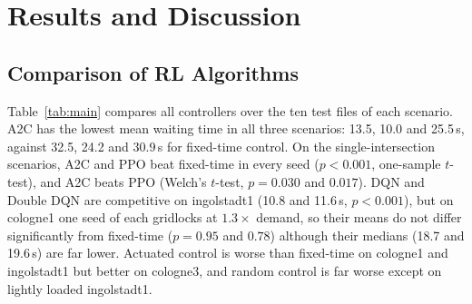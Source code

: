 \section{Results and Discussion}
\label{sec:results}


\subsection{Comparison of RL Algorithms}
Table~\ref{tab:main} compares all controllers over the ten test files of each scenario. A2C has the lowest mean waiting time in all three scenarios: 13.5, 10.0 and 25.5\,s, against 32.5, 24.2 and 30.9\,s for fixed-time control. On the single-intersection scenarios, A2C and PPO beat fixed-time in every seed ($p<0.001$, one-sample $t$-test), and A2C beats PPO (Welch's $t$-test, $p=0.030$ and $0.017$). DQN and Double DQN are competitive on ingolstadt1 (10.8 and 11.6\,s, $p<0.001$), but on cologne1 one seed of each gridlocks at $1.3\times$ demand, so their means do not differ significantly from fixed-time ($p=0.95$ and $0.78$) although their medians (18.7 and 19.6\,s) are far lower. Actuated control is worse than fixed-time on cologne1 and ingolstadt1 but better on cologne3, and random control is far worse except on lightly loaded ingolstadt1.


